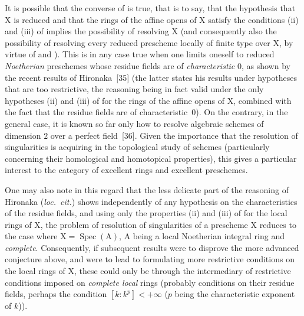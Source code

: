 \begin{remark}[7.9.6]
\label{IV.7.9.6}
It is possible that the converse of  is true, that is to say, that the hypothesis that $\mathrm{X}$ is reduced and that the rings of the affine opens of $\mathrm{X}$ satisfy the conditions (ii) and (iii) of  implies the possibility of resolving $\mathrm{X}$ (and consequently also the possibility of resolving every reduced prescheme locally of finite type over $\mathrm{X}$, by virtue of  and ). This is in any case true when one limits oneself to reduced \emph{Noetherian} preschemes whose residue fields are of \emph{characteristic} $0$, as shown by the recent results of Hironaka~[35] (the latter states his results under hypotheses that are too restrictive, the reasoning being in fact valid under the only hypotheses (ii) and (iii) of  for the rings of the affine opens of $\mathrm{X}$, combined with the fact that the residue fields are of characteristic~$0$). On the contrary, in the general case, it is known so far only how to resolve algebraic schemes of dimension $2$ over a perfect field~[36]. Given the importance that the resolution of singularities is acquiring in the topological study of schemes (particularly concerning their homological and homotopical properties), this gives a particular interest to the category of excellent rings and excellent preschemes.

One may also note in this regard that the less delicate part of the reasoning of Hironaka (\emph{loc.\ cit.}) shows independently of any hypothesis on the characteristics of the residue fields, and using only the properties (ii) and (iii) of  for the local rings of $\mathrm{X}$, the problem of resolution of singularities of a prescheme $\mathrm{X}$ reduces to the case where $\mathrm{X}=\operatorname{Spec}(\mathrm{A})$, $\mathrm{A}$ being a local Noetherian integral ring and \emph{complete}. Consequently, if subsequent results were to disprove the more advanced conjecture above, and were to lead to formulating more restrictive conditions on the local rings of $\mathrm{X}$, these could only be through the intermediary of restrictive conditions imposed on \emph{complete local} rings (probably conditions on their residue fields, perhaps the condition $[k:k^p]<+\infty$ ($p$ being the characteristic exponent of $k$)).
\end{remark}


